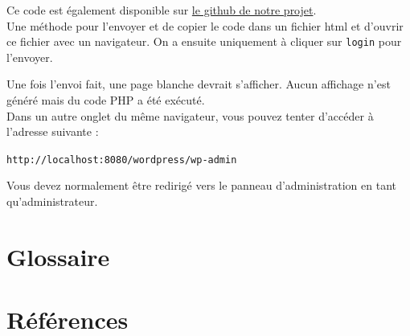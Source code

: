 \documentclass[a4,12pt]{article}
\begin{document}
Ce code est également disponible sur \href{https://github.com/matthiasbe/secuimag3a/blob/master/devoir2/docker/hack.html}{le github de notre projet}.\\

Une méthode pour l'envoyer et de copier le code dans un fichier html et d'ouvrir ce fichier avec un navigateur. On a ensuite uniquement à cliquer sur \texttt{login} pour l'envoyer.

Une fois l'envoi fait, une page blanche devrait s'afficher. Aucun affichage n'est généré mais du code PHP a été exécuté.\\

Dans un autre onglet du même navigateur, vous pouvez tenter d'accéder à l'adresse suivante :

\texttt{http://localhost:8080/wordpress/wp-admin}

Vous devez normalement être redirigé vers le panneau d'administration en tant qu'administrateur.

\section{Glossaire}

\section{Références}
\end{document}

